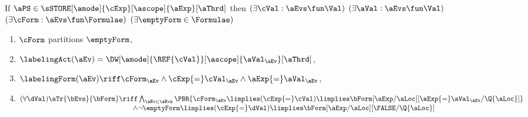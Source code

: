 \begin{scope}
  \label{def:semcaaddr}

  \noindent
  If $\aPS \in \sSTORE[\amode]{\cExp}[\ascope]{\aExp}[\aThrd]$ then
  $(\exists\cVal:\aEvs\fun\Val)$
  $(\exists\aVal:\aEvs\fun\Val)$
  $(\exists\cForm:\aEvs\fun\Formulae)$
  $(\exists\emptyForm\in\Formulae)$
  \begin{multicols}{2}
    \begin{enumerate}[topsep=0pt,label=(\textsc{w}\arabic*),ref=\textsc{w}\arabic*]
    \item \label{write-E-ca-addr}
      $\cForm$ partitions $\emptyForm$,
    \item \label{write-lambda-ca-addr}
      $\labelingAct(\aEv) = \DW[\amode]{\REF{\cVal}}[\ascope]{\aVal_\aEv}[\aThrd]$,
    \item \label{write-kappa-ca-addr}
      \begin{math}
        \labelingForm(\aEv) \riff
        \cForm_\aEv
        \land \cExp{=}\cVal_\aEv
        \land \aExp{=}\aVal_\aEv
      \end{math},      
    \item
    \begin{math}
      (\forall\dVal)
      \begin{aligned}[t]
        \aTr{\bEvs}{\bForm} \riff
        &\textstyle\bigwedge_{\aEv\in\aEvs}
        \PBR{
          \cForm_\aEv
          \limplies (\cExp{=}\cVal)
          \limplies 
          \bForm[\aExp/\aLoc][\aExp{=}\aVal_\aEv/\Q{\aLoc}]
        }
        \\[-.5ex]
        \land
        &
        \lnot\emptyForm
        \limplies (\cExp{=}\dVal)
        \limplies 
        \bForm[\aExp/\aLoc][\FALSE/\Q{\aLoc}]
      \end{aligned}
    \end{math}
    \columnbreak

\end{enumerate}
\end{multicols}
\end{scope}
